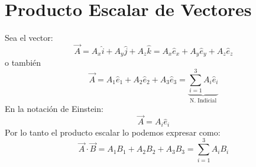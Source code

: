 \documentclass[../main]{subfiles}
\begin{document}
\section{Producto Escalar de Vectores}
Sea el vector: 
\begin{equation}
    \Vec{A}=A_x \hat{i}+A_y\hat{j}+A_z \hat{k}=A_x \hat{e}_x+A_y\hat{e}_y+A_z\hat{e}_z
\end{equation}
o también
\begin{equation}
    \Vec{A}=A_1 \hat{e}_1+A_2 \hat{e}_2+A_3\hat{e}_3=\underbrace{\sum_{i=1}^3 A_i \hat{e}_i}_{\text{N. Indicial}}
\end{equation}
En la notación de Einstein:
\begin{equation}
    \Vec{A}=A_i \hat{e}_i
\end{equation}
Por lo tanto el producto escalar lo podemos expresar como:
\begin{equation}
    \Vec{A}\cdot \Vec{B}=A_1 B_1+A_2 B_2 + A_3 B_3 = \sum_{i=1}^3 A_i B_i
\end{equation}
\end{document}
